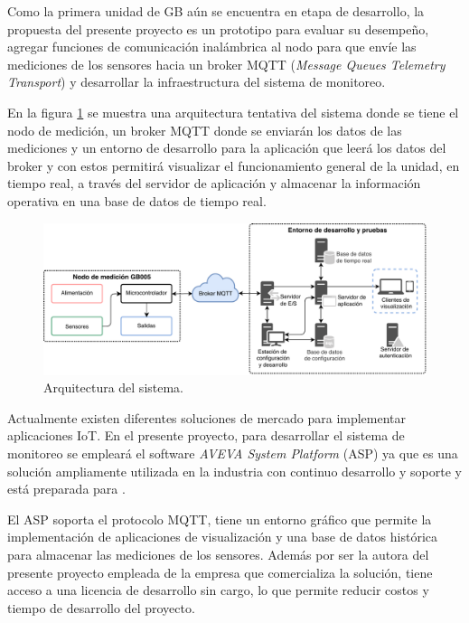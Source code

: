 \documentclass[
11pt, %
]{charter}
\begin{document}
Como la primera unidad de GB aún se encuentra en etapa de desarrollo, la propuesta del presente proyecto es un prototipo para evaluar su desempeño, agregar funciones de comunicación inalámbrica al nodo para que envíe las mediciones de los sensores hacia un broker MQTT (\textit{Message Queues Telemetry Transport}) y desarrollar la infraestructura del sistema de monitoreo.

En la figura \ref{fig:diagBloques} se muestra una arquitectura tentativa del sistema donde se tiene el nodo de medición, un broker MQTT donde se enviarán los datos de las mediciones y un entorno de desarrollo para la aplicación que leerá los datos del broker y con estos permitirá visualizar el funcionamiento general de la unidad, en tiempo real, a través del servidor de aplicación y almacenar la información operativa en una base de datos de tiempo real. 

\begin{figure}[htpb]
\centering 
\includegraphics[width=1\textwidth]{./Figuras/diagBloques.pdf}
\caption{Arquitectura del sistema.}
\label{fig:diagBloques}
\end{figure}

\vspace{25px}

Actualmente existen diferentes soluciones de mercado para implementar aplicaciones IoT. En el presente proyecto, para desarrollar el sistema de monitoreo se empleará el software \textit{AVEVA System Platform} (ASP) ya que es una solución ampliamente utilizada en la industria con continuo desarrollo y soporte y está preparada para .

El ASP soporta el protocolo MQTT, tiene un entorno gráfico que permite la implementación de aplicaciones de visualización y una base de datos histórica para almacenar las mediciones de los sensores. Además por ser la autora del presente proyecto empleada de la empresa que comercializa la solución, tiene acceso a una licencia de desarrollo sin cargo, lo que permite reducir costos y tiempo de desarrollo del proyecto.
\end{document}
